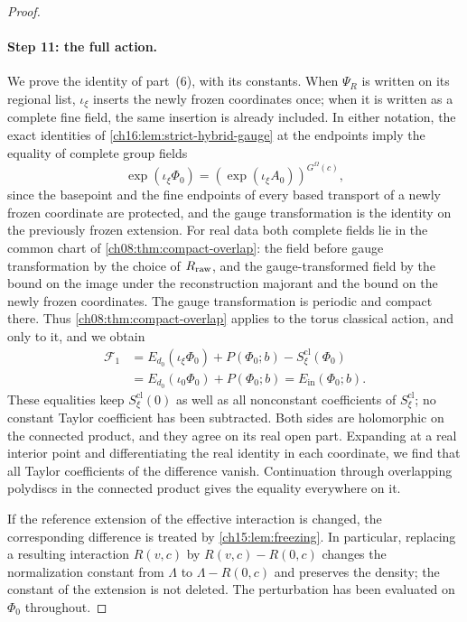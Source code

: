 \begin{proof}
\paragraph{Step 11: the full action.}
We prove the identity of part~(6), with its constants. When $\Psi_R$ is written on its regional list, $\iota_\xi$ inserts the newly frozen coordinates once; when it is written as a complete fine field, the same insertion is already included. In either notation, the exact identities of \cref{ch16:lem:strict-hybrid-gauge} at the endpoints imply the equality of complete group fields
\[
 \exp(\iota_\xi\Phi_0)
                  =(\exp(\iota_\xi A_0))^{G^\Omega(c)},
\]
since the basepoint and the fine endpoints of every based transport of a newly frozen coordinate are protected, and the gauge transformation is the identity on the previously frozen extension. For real data both complete fields lie in the common chart of \cref{ch08:thm:compact-overlap}: the field before gauge transformation by the choice of $R_{\mathrm{raw}}$, and the gauge-transformed field by the bound on the image under the reconstruction majorant and the bound on the newly frozen coordinates. The gauge transformation is periodic and compact there. Thus \cref{ch08:thm:compact-overlap} applies to the torus classical action, and only to it, and we obtain
\begin{align*}
 \mathcal F_1
 &=E_{d_0}(\iota_\xi\Phi_0)
                          +P(\Phi_0;b)-S_\xi^{\mathrm{cl}}(\Phi_0)\\
 &=E_{d_0}(\iota_0\Phi_0)+P(\Phi_0;b)
                          =E_{\mathrm{in}}(\Phi_0;b).
\end{align*}
These equalities keep $S_\xi^{\mathrm{cl}}(0)$ as well as all nonconstant coefficients of $S_\xi^{\mathrm{cl}}$; no constant Taylor coefficient has been subtracted. Both sides are holomorphic on the connected product, and they agree on its real open part. Expanding at a real interior point and differentiating the real identity in each coordinate, we find that all Taylor coefficients of the difference vanish. Continuation through overlapping polydiscs in the connected product gives the equality everywhere on it.

If the reference extension of the effective interaction is changed, the corresponding difference is treated by \cref{ch15:lem:freezing}. In particular, replacing a resulting interaction $R(v,c)$ by $R(v,c)-R(0,c)$ changes the normalization constant from $\Lambda$ to $\Lambda-R(0,c)$ and preserves the density; the constant of the extension is not deleted. The perturbation has been evaluated on $\Phi_0$ throughout.


\end{proof}
